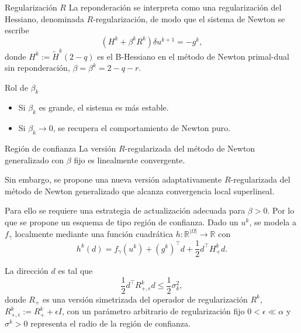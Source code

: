 \documentclass[9pt]{beamer}
\begin{document}
\begin{frame}{Regularización \(R\)}
La reponderación se interpreta como una regularización del Hessiano, denominada $R$-regularización, de modo que el sistema de Newton se escribe 
\[
    (H^k+\beta^k R^k)\delta u^{k+1}=-g^k,
\]
donde $H^k:=\tilde{H}^k(2-q)$ es el B-Hessiano en el método de Newton primal-dual sin reponderación, $\beta=\beta^k=2-q-r$.

\begin{block}{Rol de \(\beta_k\)}
\begin{itemize}
    \item Si \(\beta_k\) es grande, el sistema es más estable.
    \item Si \(\beta_k\to 0\), se recupera el comportamiento de Newton puro.
\end{itemize}
\end{block}

\end{frame}

\begin{frame}{Región de confianza}
La versión $R$-regularizada del método de Newton generalizado con $\beta$ fijo es linealmente convergente. \vspace{0.15cm}

Sin embargo, se propone una nueva versión adaptativamente $R$-regularizada del método de Newton generalizado que alcanza convergencia local superlineal. \vspace{0.15cm}

Para ello se requiere una estrategia de actualización adecuada para $\beta>0$. Por lo que se propone un esquema de tipo región de confianza. Dado un $u^k$, se modela a $f_\gamma$ localmente mediante una función cuadrática $h:\mathbb{R}^{|\Omega|}\to\mathbb{R}$ con
\[
    h^k(d)=f_\gamma(u^k)+(g^k)^\top d+\frac12 d^\top H_+^kd.
\]

La dirección $d$ es tal que 
\[
    \frac12 d^\top R_{+,\epsilon}^kd\leq \frac12\sigma_k^2,
\]
donde $R_+$ es una versión simetrizada del operador de regularización $R^k$, $R_{+,\epsilon}^k:=R_+^k+\epsilon I$, con un parámetro arbitrario de regularización fijo $0<\epsilon\ll \alpha$ y $\sigma^k>0$ representa el radio de la región de confianza. 
\end{frame}
\end{document}
